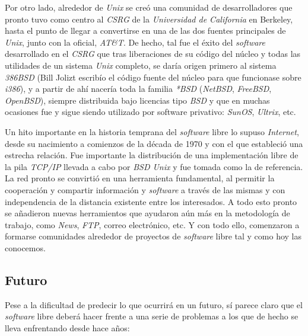 Por otro lado, alrededor de \textit{Unix} se creó una comunidad de
desarrolladores que pronto tuvo como centro al \textit{CSRG} de la
\textit{Universidad de California} en Berkeley, hasta el punto de llegar a
convertirse en una de las dos fuentes principales de \textit{Unix}, junto con la
oficial, \textit{AT&T}. De hecho, tal fue el éxito del \textit{software}
desarrollado en el \textit{CSRG} que tras liberaciones de su código del núcleo y
todas las utilidades de un sistema \textit{Unix} completo, se daría origen
primero al sistema \textit{386BSD} (Bill Jolizt escribío el código fuente del
núcleo para que funcionase sobre \textit{i386}), y a partir de ahí nacería toda
la familia \textit{*BSD} (\textit{NetBSD}, \textit{FreeBSD}, \textit{OpenBSD}),
siempre distribuida bajo licencias tipo \textit{BSD} y que en muchas ocasiones
fue y sigue siendo utilizado por software privativo: \textit{SunOS},
\textit{Ultrix}, etc.

Un hito importante en la historia temprana del \textit{software} libre lo supuso
\textit{Internet}, desde su nacimiento a comienzos de la década de 1970 y con el
que estableció una estrecha relación. Fue importante la distribución de una
implementación libre de la pila \textit{TCP/IP} llevada a cabo por \textit{BSD
Unix} y fue tomada como la de referencia. La red pronto se convirtió en una
herramienta fundamental, al permitir la cooperación y compartir información y
\textit{software} a través de las mismas y con independencia de la distancia
existente entre los interesados. A todo esto pronto se añadieron nuevas
herramientos que ayudaron aún más en la metodología de trabajo, como
\textit{News}, \textit{FTP}, correo electrónico, etc. Y con todo ello,
comenzaron a formarse comunidades alrededor de proyectos de \textit{software}
libre tal y como hoy las conocemos.

\subsection{Futuro}

Pese a la dificultad de predecir lo que ocurrirá en un futuro, sí parece claro
que el \textit{software} libre deberá hacer frente a una serie de problemas a
los que de hecho se lleva enfrentando desde hace años:

